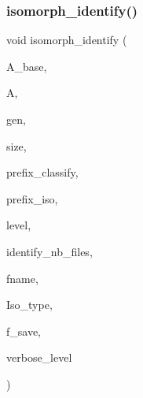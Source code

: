 \subsubsection{\texorpdfstring{isomorph\+\_\+identify()}{isomorph\_identify()}}
{\footnotesize\ttfamily void isomorph\+\_\+identify (\begin{DoxyParamCaption}\item[{\mbox{\hyperlink{classaction}{action}} $\ast$}]{A\+\_\+base,  }\item[{\mbox{\hyperlink{classaction}{action}} $\ast$}]{A,  }\item[{\mbox{\hyperlink{classgenerator}{generator}} $\ast$}]{gen,  }\item[{\mbox{\hyperlink{galois_8h_a09fddde158a3a20bd2dcadb609de11dc}{I\+NT}}}]{size,  }\item[{const \mbox{\hyperlink{galois_8h_ab6cc7b4aeb6ea31aba2b3fbfc83ff5e6}{B\+Y\+TE}} $\ast$}]{prefix\+\_\+classify,  }\item[{const \mbox{\hyperlink{galois_8h_ab6cc7b4aeb6ea31aba2b3fbfc83ff5e6}{B\+Y\+TE}} $\ast$}]{prefix\+\_\+iso,  }\item[{\mbox{\hyperlink{galois_8h_a09fddde158a3a20bd2dcadb609de11dc}{I\+NT}}}]{level,  }\item[{\mbox{\hyperlink{galois_8h_a09fddde158a3a20bd2dcadb609de11dc}{I\+NT}}}]{identify\+\_\+nb\+\_\+files,  }\item[{const \mbox{\hyperlink{galois_8h_ab6cc7b4aeb6ea31aba2b3fbfc83ff5e6}{B\+Y\+TE}} $\ast$$\ast$}]{fname,  }\item[{\mbox{\hyperlink{galois_8h_a09fddde158a3a20bd2dcadb609de11dc}{I\+NT}} $\ast$}]{Iso\+\_\+type,  }\item[{\mbox{\hyperlink{galois_8h_a09fddde158a3a20bd2dcadb609de11dc}{I\+NT}}}]{f\+\_\+save,  }\item[{\mbox{\hyperlink{galois_8h_a09fddde158a3a20bd2dcadb609de11dc}{I\+NT}}}]{verbose\+\_\+level }\end{DoxyParamCaption})}

\mbox{\label{isomorph__global_8_c_a9fd19ea945561cf2a6bb5c72dd4b1cb2}} 
